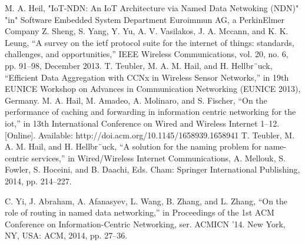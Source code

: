 \documentclass[conference]{IEEEtran}
\begin{document}
\begin{thebibliography}{00}
M. A. Heil, "IoT-NDN: An IoT Architecture via Named Data
Netwoking (NDN)" "in" Software Embedded System Department
Euroimmun AG, a PerkinElmer Company
 Z. Sheng, S. Yang, Y. Yu, A. V. Vasilakos, J. A. Mccann, and K. K.
Leung, “A survey on the ietf protocol suite for the internet of things:
standards, challenges, and opportunities,” IEEE Wireless Communications,
vol. 20, no. 6, pp. 91–98, December 2013.
 T. Teubler, M. A. M. Hail, and H. Hellbr¨uck, “Efficient Data Aggregation
with CCNx in Wireless Sensor Networks,” in 19th EUNICE Workshop
on Advances in Communication Networking (EUNICE 2013), Germany.
M. A. Hail, M. Amadeo, A. Molinaro, and S. Fischer, “On the performance
of caching and forwarding in information centric networking for
the iot,” in 13th International Conference on Wired and Wireless Internet
1–12. [Online]. Available: http://doi.acm.org/10.1145/1658939.1658941
T. Teubler, M. A. M. Hail, and H. Hellbr¨uck, “A solution for the
naming problem for name-centric services,” in Wired/Wireless Internet
Communications, A. Mellouk, S. Fowler, S. Hoceini, and B. Daachi,
Eds. Cham: Springer International Publishing, 2014, pp. 214–227.
    
    
    
    
C. Yi, J. Abraham, A. Afanasyev, L. Wang, B. Zhang, and L. Zhang,
“On the role of routing in named data networking,” in Proceedings of
the 1st ACM Conference on Information-Centric Networking, ser. ACMICN
’14. New York, NY, USA: ACM, 2014, pp. 27–36.
    
    
    
    
\end{thebibliography}
\end{document}
